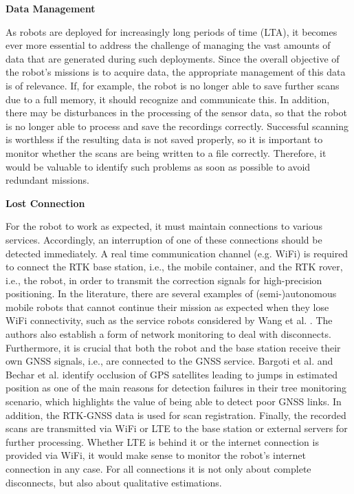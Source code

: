 \documentclass[english, master, utf8]{base/thesis_KBS}
\begin{document}
\noindent
\textbf{Data Management}\newline

\noindent
As robots are deployed for increasingly long periods of time (LTA), it becomes ever more essential to address the challenge of managing the vast amounts of data that are generated
during such deployments. \cite{Ambrus:2014} Since the overall objective of the robot's missions is to acquire data, the appropriate management of this data is of relevance.
If, for example, the robot is no longer able to save further scans due to a full memory, it should recognize and communicate this.
In addition, there may be disturbances in the processing of the sensor data, so that the robot is no longer able to process and save the recordings correctly.
Successful scanning is worthless if the resulting data is not saved properly, so it is important to monitor whether the scans are being written to a file correctly.
Therefore, it would be valuable to identify such problems as soon as possible to avoid redundant missions.\newline

\noindent
\textbf{Lost Connection}\newline

\noindent
For the robot to work as expected, it must maintain connections to various services. Accordingly, an interruption of one of these connections should be detected immediately.
A real time communication channel (e.g. WiFi) is required to connect the RTK base station, i.e., the mobile container, and the RTK rover, i.e., the robot, in order to
transmit the correction signals for high-precision positioning. In the literature, there are several examples of (semi-)autonomous mobile robots that cannot continue their
mission as expected when they lose WiFi connectivity, such as the service robots considered by Wang et al. \cite{Wang:2018}. The authors also establish a form of network monitoring
to deal with disconnects.
Furthermore, it is crucial that both the robot and the base station receive their own GNSS signals,
i.e., are connected to the GNSS service. Bargoti et al. \cite{Bargoti:2015} and Bechar et al. \cite{Bechar:2016} identify occlusion of GPS satellites leading to jumps in estimated position as one of the main reasons
for detection failures in their tree monitoring scenario, which highlights the value of being able to detect poor GNSS links.
In addition, the RTK-GNSS data is used for scan registration. Finally, the recorded scans are transmitted via WiFi or LTE 
to the base station or external servers for further processing. Whether LTE is behind it or the internet connection is provided via WiFi, it would make sense
to monitor the robot's internet connection in any case. For all connections it is not only about complete disconnects, but also about qualitative estimations.\newline
\end{document}

